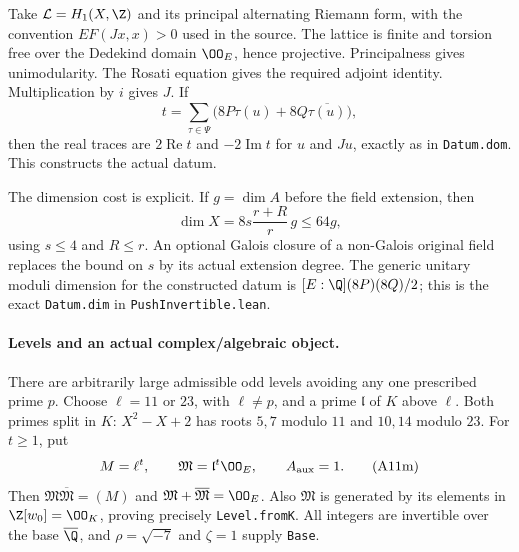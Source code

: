Take $\mathcal L=H_1(X,\Z)$ and its principal alternating
Riemann form, with the convention $EF(Jx,x)>0$ used in the
source.  The lattice is finite and torsion free over the
Dedekind domain $\OO_E$, hence projective.  Principalness gives
unimodularity.  The Rosati equation gives the required adjoint
identity.  Multiplication by $i$ gives $J$.  If
\[
 t=\sum_{\tau\in\Psi}\bigl(8P\tau(u)+8Q\overline{\tau(u)}\bigr),
\]
then the real traces are $2\operatorname{Re}t$ and
$-2\operatorname{Im}t$ for $u$ and $Ju$, exactly as in
\texttt{Datum.dom}.  This constructs the actual datum.

The dimension cost is explicit.  If $g=\dim A$ before the
field extension, then
\[
       \dim X=8s\frac{r+R}{r}\,g\leq64g,
 \tag{A11l}
\]
using $s\leq4$ and $R\leq r$.  An optional Galois closure of
a non-Galois original field replaces the bound on $s$ by its
actual extension degree.  The generic unitary moduli dimension
for the constructed datum is
$[E:\Q](8P)(8Q)/2$; this is the exact \texttt{Datum.dim}
in \texttt{PushInvertible.lean}.

\paragraph{Levels and an actual complex/algebraic object.}
There are arbitrarily large admissible odd levels avoiding any
one prescribed prime $p$.  Choose $\ell=11$ or $23$, with
$\ell\ne p$, and a prime $\mathfrak l$ of $K$ above $\ell$.
Both primes split in $K$: $X^2-X+2$ has roots $5,7$ modulo
$11$ and $10,14$ modulo $23$.  For $t\geq1$, put
\[
       M=\ell^t,\qquad
       \mathfrak M=\mathfrak l^t\OO_E,\qquad A_{\rm aux}=1.
 \tag{A11m}
\]
Then $\mathfrak M\overline{\mathfrak M}=(M)$ and
$\mathfrak M+\overline{\mathfrak M}=\OO_E$.  Also
$\mathfrak M$ is generated by its elements in
$\Z[w_0]=\OO_K$, proving precisely \texttt{Level.fromK}.
All integers are invertible over the base $\overline\Q$,
and $\rho=\sqrt{-7}$ and $\zeta=1$ supply \texttt{Base}.

